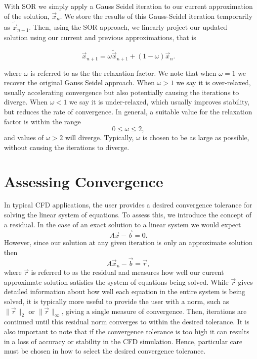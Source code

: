 With SOR we simply apply a Gauss Seidel iteration to our current approximation of the solution, $\vec{x}_n$. We store the results of this Gauss-Seidel iteration temporarily as $\tilde{\vec{x}}_{n+1}$. Then, using the SOR approach, we linearly project our updated solution using our current and previous approximations, that is
\begin{eqBox}
\begin{equation}
	\vec{x}_{n+1} = \omega \tilde{\vec{x}}_{n+1} + (1-\omega) \vec{x}_n.
\end{equation}
\end{eqBox}
where $\omega$ is referred to as the the relaxation factor. We note that when $\omega=1$ we recover the original Gauss Seidel approach. When $\omega>1$ we say it is over-relaxed, usually accelerating convergence but also potentially causing the iterations to diverge. When $\omega<1$ we say it is under-relaxed, which usually improves stability, but reduces the rate of convergence. In general, a suitable value for the relaxation factor is within the range
\begin{equation}
	0 \leq \omega \leq 2,
\end{equation}
and values of $\omega > 2$ will diverge. Typically, $\omega$ is chosen to be as large as possible, without causing the iterations to diverge.

\section{Assessing Convergence}
In typical CFD applications, the user provides a desired convergence tolerance for solving the linear system of equations. To assess this, we introduce the concept of a residual. In the case of an exact solution to a linear system we would expect
\begin{equation}
	A \vec{x} - \vec{b} = 0.
\end{equation}
However, since our solution at any given iteration is only an approximate solution then
\begin{equation}
	A \vec{x}_n - \vec{b} = \vec{r},
\end{equation}
where $\vec{r}$ is referred to as the residual and measures how well our current approximate solution satisfies the system of equations being solved. While $\vec{r}$ gives detailed information about how well each equation in the entire system is being solved, it is typically more useful to provide the user with a norm, such as $\| \vec{r} \|_2$ or $\| \vec{r} \|_\infty$, giving a single measure of convergence. Then, iterations are continued until this residual norm converges to within the desired tolerance. It is also important to note that if the convergence tolerance is too high it can results in a loss of accuracy or stability in the CFD simulation. Hence, particular care must be chosen in how to select the desired convergence tolerance.

